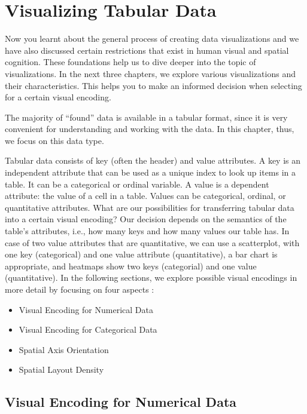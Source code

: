 \documentclass[
]{book}
\providecommand{\tightlist}{%
  \setlength{\itemsep}{0pt}\setlength{\parskip}{0pt}}
\begin{document}
\hypertarget{visualizing-tabular-data}{%
\chapter{Visualizing Tabular Data}\label{visualizing-tabular-data}}

Now you learnt about the general process of creating data visualizations and we have also discussed certain restrictions that exist in human visual and spatial cognition. These foundations help us to dive deeper into the topic of visualizations. In the next three chapters, we explore various visualizations and their characteristics. This helps you to make an informed decision when selecting for a certain visual encoding.

The majority of ``found'' data is available in a tabular format, since it is very convenient for understanding and working with the data. In this chapter, thus, we focus on this data type.

Tabular data \citep{munzner2014visualization} consists of key (often the header) and value attributes. A key is an independent attribute that can be used as a unique index to look up items in a table. It can be a categorical or ordinal variable. A value is a dependent attribute: the value of a cell in a table. Values can be categorical, ordinal, or quantitative attributes. What are our possibilities for transferring tabular data into a certain visual encoding? Our decision depends on the semantics of the table's attributes, i.e., how many keys and how many values our table has. In case of two value attributes that are quantitative, we can use a scatterplot, with one key (categorical) and one value attribute (quantitative), a bar chart is appropriate, and heatmaps show two keys (categorial) and one value (quantitative). In the following sections, we explore possible visual encodings in more detail by focusing on four aspects \citep{munzner2014visualization}:

\begin{itemize}
\tightlist
\item
  Visual Encoding for Numerical Data
\item
  Visual Encoding for Categorical Data
\item
  Spatial Axis Orientation
\item
  Spatial Layout Density
\end{itemize}

\hypertarget{visual-encoding-for-numerical-data}{%
\section{Visual Encoding for Numerical Data}\label{visual-encoding-for-numerical-data}}
\end{document}
